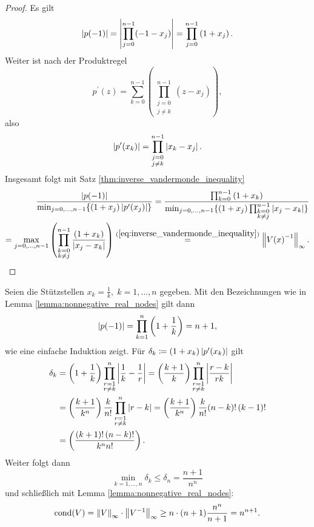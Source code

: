 \begin{proof}
    Es gilt
    \[
        \left\lvert p(-1) \right\rvert = \left\lvert \prod_{j=0}^{n-1} (-1 - x_j) \right\rvert = \prod_{j=0}^{n-1} \left( 1 + x_j \right).
    \]
    Weiter ist nach der Produktregel
    \[
        p^{\prime}(z) = \sum_{k=0}^{n-1} \left( \prod_{\substack{j=0\\ j\neq k}}^{n-1} \left( z - x_j \right) \right),
    \]
    also
    \[
        \left\lvert p^{\prime}(x_k) \right\rvert = \prod_{\substack{j=0\\ j\neq k}}^{n-1} \left\lvert  x_k - x_j  \right\rvert.
    \]
    Insgesamt folgt mit Satz \ref{thm:inverse_vandermonde_inequality}
    \[
        \begin{split}
            \frac{ \left\lvert p(-1) \right\rvert}{\min_{j=0, \dots, n-1} \{ (1+x_j) \left\lvert p^{\prime}(x_j) \right\rvert \}}
            = \frac{\prod_{k=0}^{n-1} \left( 1 + x_k \right)}{\min_{j=0, \dots, n-1} \{ (1+x_j) \prod_{\substack{k=0\\ k\neq j}}^{n-1} \left\lvert  x_j - x_k  \right\rvert\}}\\
            = \max_{j=0, \dots, n-1} \left( \prod_{\substack{k=0\\ k \neq j}}^{n-1} \frac{\left( 1 + x_k \right)}{\left\lvert  x_j - x_k  \right\rvert} \right)
            \overset{(\ref{eq:inverse_vandermonde_inequality})}{=} \left\lVert \text{$V(x)$}^{-1} \right\rVert_{\infty}.
        \end{split}
    \]
\end{proof}

\begin{example}
    Seien die Stützstellen $x_k = \frac{1}{k}, \; k=1, \dots, n$ gegeben.
    Mit den Bezeichnungen wie in Lemma \ref{lemma:nonnegative_real_nodes} gilt dann
    \[
        \left\lvert p(-1) \right\rvert = \prod_{k=1}^{n} \left( 1 + \frac{1}{k} \right) = n+1,
    \]
    wie eine einfache Induktion zeigt.
    Für $\delta_k \coloneqq (1 + x_k) \left\lvert  p^{\prime}(x_k)  \right\rvert$ gilt
    \[
        \begin{split}
            \delta_k &= \left( 1 + \frac{1}{k} \right) \prod_{\substack{r = 1\\ r\neq k}}^n \left\lvert  \frac{1}{k} - \frac{1}{r}  \right\rvert
                     = \left( \frac{k+1}{k} \right) \prod_{\substack{r = 1\\ r\neq k}}^n \left\lvert  \frac{r-k}{rk} \right\rvert\\
                     &= \left( \frac{k+1}{k^n} \right) \frac{k}{n!} \prod_{\substack{r = 1\\ r\neq k}}^n \left\lvert  r-k  \right\rvert
                     = \left( \frac{k+1}{k^n} \right) \frac{k}{n!} (n-k)! \, (k-1)!\\
                     &= \left( \frac{(k+1)! \, (n-k)!}{k^n n!} \right).
        \end{split}
    \]
    Weiter folgt dann
    \[
        \min_{k=1, \dots, n} \delta_k \leq \delta_n = \frac{n+1}{n^n}
    \]
    und schließlich mit Lemma \ref{lemma:nonnegative_real_nodes}:
    \[
        \text{cond$(V)$} = \left\lVert V \right\rVert_\infty \cdot \left\lVert V^{-1} \right\rVert_\infty \geq n \cdot (n+1) \frac{n^n}{n+1} = n^{n+1}.
    \]
\end{example}

